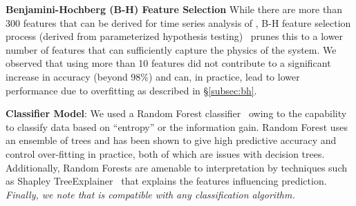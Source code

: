 \cii \textbf{Benjamini-Hochberg (B-H) Feature Selection} While there are more than 300 features that can be derived for time series analysis of \aout, B-H feature selection process (derived from parameterized hypothesis testing)~\cite{benjamini1995controlling,christ2018time} prunes this to a lower number of features that can sufficiently capture the physics of the system. We observed that using more than 10 features did not contribute to a significant increase in accuracy (beyond 98\%) and can, in practice, lead to lower performance due to overfitting as described in \S\ref{subsec:bh}.%

\ciii \textbf{Classifier Model}: We used a Random Forest classifier~\cite{polikar2012ensemble, breiman2001random} owing to the capability to classify data based on ``entropy'' or the information gain.  %
Random Forest uses an ensemble of trees and has been shown to give high predictive accuracy and control over-fitting in practice, both of which are issues with decision trees. Additionally, Random Forests are amenable to interpretation by techniques such as Shapley TreeExplainer~\cite{lundberg2020local2global} that explains the features influencing prediction. \textit{Finally, we note that \aout is compatible with any classification algorithm.}




